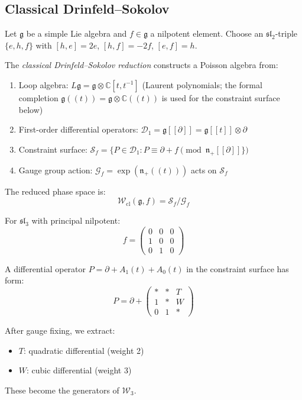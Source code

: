 \subsection{Classical Drinfeld--Sokolov}

\begin{definition}\label{def:classical-ds}
Let $\mathfrak{g}$ be a simple Lie algebra and $f \in \mathfrak{g}$ a nilpotent element. Choose an $\mathfrak{sl}_2$-triple $\{e, h, f\}$ with $[h,e] = 2e$, $[h,f] = -2f$, $[e,f] = h$.

The \emph{classical Drinfeld--Sokolov reduction} constructs a Poisson algebra from:
\begin{enumerate}
\item Loop algebra: $L\mathfrak{g} = \mathfrak{g} \otimes \mathbb{C}[t, t^{-1}]$ (Laurent polynomials; the formal completion $\mathfrak{g}((t)) = \mathfrak{g} \otimes \mathbb{C}((t))$ is used for the constraint surface below)
\item First-order differential operators: $\mathcal{D}_1 = \mathfrak{g}[[\partial]] = \mathfrak{g}[[t]] \otimes \partial$
\item Constraint surface: $\mathcal{S}_f = \{P \in \mathcal{D}_1 : P \equiv \partial + f \pmod{\mathfrak{n}_+[[\partial]]\}}$
\item Gauge group action: $\mathcal{G}_f = \exp(\mathfrak{n}_+((t)))$ acts on $\mathcal{S}_f$
\end{enumerate}

The reduced phase space is:
\begin{equation}
\mathcal{W}_{\text{cl}}(\mathfrak{g}, f) = \mathcal{S}_f / \mathcal{G}_f
\end{equation}
\end{definition}

\begin{example}
For $\mathfrak{sl}_3$ with principal nilpotent:
\begin{equation}
f = \begin{pmatrix} 0 & 0 & 0 \\ 1 & 0 & 0 \\ 0 & 1 & 0 \end{pmatrix}
\end{equation}

A differential operator $P = \partial + A_1(t) + A_0(t)$ in the constraint surface has form:
\begin{equation}
P = \partial + \begin{pmatrix} * & * & T \\ 1 & * & W \\ 0 & 1 & * \end{pmatrix}
\end{equation}

After gauge fixing, we extract:
\begin{itemize}
\item $T$: quadratic differential (weight 2)
\item $W$: cubic differential (weight 3)
\end{itemize}
These become the generators of $\mathcal{W}_3$.
\end{example}

